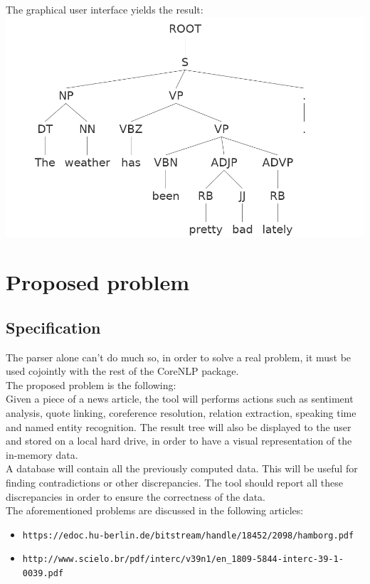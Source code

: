 \documentclass[a4paper,10pt]{article}
\begin{document}
 The graphical user interface yields the result: \\
 \includegraphics[scale=0.5]{tree2}
    
 
 \section{Proposed problem}
  \subsection{Specification} 
  The parser alone can't do much so, in order to solve a real problem, it must be used cojointly with the rest of the CoreNLP package. \\
  The proposed problem is the following: \\
  Given a piece of a news article, the tool will performs actions such as sentiment analysis, quote linking, coreference resolution, relation extraction, speaking time and named entity recognition. The result tree will also be displayed to the user and stored on a local hard drive, in order to have a visual representation of the in-memory data. \\
  A database will contain all the previously computed data. This will be useful for finding contradictions or other discrepancies. The tool should report all these discrepancies in order to ensure the correctness of the data. \\
  The aforementioned problems are discussed in the following articles: 
  
  \begin{itemize}
   \item \verb|https://edoc.hu-berlin.de/bitstream/handle/18452/2098/hamborg.pdf|
   \item \verb|http://www.scielo.br/pdf/interc/v39n1/en_1809-5844-interc-39-1-0039.pdf|
  \end{itemize}
  
\end{document}
